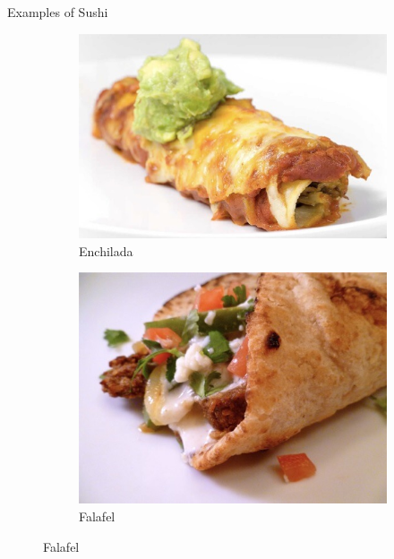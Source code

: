 \documentclass{beamer}
\begin{document}
\begin{frame}{Examples of Sushi}
    \begin{figure}
        \begin{subfigure}{.4\textwidth}
          \centering
          \includegraphics[width=.8\linewidth]{images/cube_rule_of_food/sushi/22_enchilada.jpg}
          \caption{\label{fig:enchilada}Enchilada}
        \end{subfigure}
        \begin{subfigure}{.4\textwidth}
          \centering
          \includegraphics[width=.8\linewidth]{images/cube_rule_of_food/sushi/22_falafel.jpg}
          \caption{\label{fig:falafel}Falafel}

\end{subfigure}
\end{figure}
\end{frame}
\end{document}
